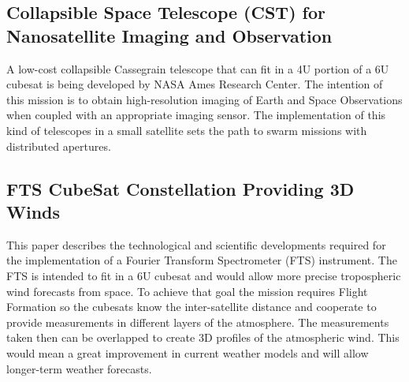 \subsection{Collapsible Space Telescope (CST) for Nanosatellite Imaging and Observation}

A low-cost collapsible Cassegrain telescope that can fit in a 4U portion of a 6U cubesat is being developed by NASA Ames Research Center. The intention of this mission is to obtain high-resolution imaging of Earth and Space Observations when coupled with an appropriate imaging sensor. The implementation of this kind of telescopes in a small satellite sets the path to swarm missions with distributed apertures.\cite{Elwood_CollapsibleTelescope}

\subsection{FTS CubeSat Constellation Providing 3D Winds}

This paper describes the technological and scientific developments required for the implementation of a Fourier Transform Spectrometer (FTS) instrument. The FTS is intended to fit in a 6U cubesat and would allow more precise tropospheric wind forecasts from space. To achieve that goal the mission requires Flight Formation so the cubesats know the inter-satellite distance and cooperate to provide measurements in different layers of the atmosphere. The measurements taken then can be overlapped to create 3D profiles of the atmospheric wind. This would mean a great improvement in current weather models and will allow longer-term weather forecasts. \cite{Wloszek_3Dwinds}